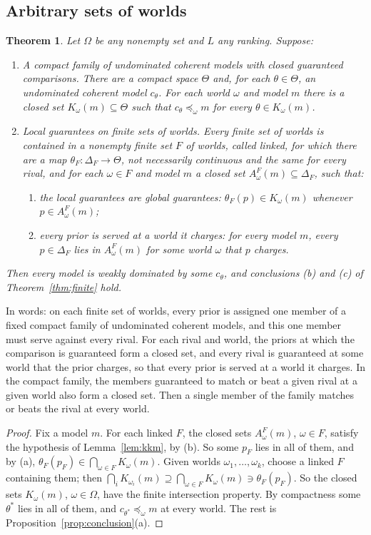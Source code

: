 \documentclass[11pt]{article}
\newtheorem{theorem}{Theorem}[section]
\theoremstyle{definition}
\theoremstyle{remark}
\begin{document}
\subsection{Arbitrary sets of worlds}
\begin{theorem}\label{thm:local}
Let $\Omega$ be any nonempty set and $L$ any ranking. Suppose:
\begin{enumerate}[label=\arabic*.,leftmargin=*]
\item \emph{A compact family of undominated coherent models with closed guaranteed comparisons.} There are a compact space $\Theta$ and, for each $\theta\in\Theta$, an undominated coherent model $c_\theta$. For each world $\omega$ and model $m$ there is a closed set $K_\omega(m)\subseteq\Theta$ such that $c_\theta\preceq_\omega m$ for every $\theta\in K_\omega(m)$.
\item \emph{Local guarantees on finite sets of worlds.} Every finite set of worlds is contained in a nonempty finite set $F$ of worlds, called \emph{linked}, for which there are a map $\theta_F:\Delta_F\to\Theta$, not necessarily continuous and the same for every rival, and for each $\omega\in F$ and model $m$ a closed set $A^F_\omega(m)\subseteq\Delta_F$, such that:
\begin{enumerate}[label=(\alph*)]
\item the local guarantees are global guarantees: $\theta_F(p)\in K_\omega(m)$ whenever $p\in A^F_\omega(m)$;
\item every prior is served at a world it charges: for every model $m$, every $p\in\Delta_F$ lies in $A^F_\omega(m)$ for some world $\omega$ that $p$ charges.
\end{enumerate}
\end{enumerate}
Then every model is weakly dominated by some $c_\theta$, and conclusions (b) and (c) of Theorem~\ref{thm:finite} hold.
\end{theorem}
In words: on each finite set of worlds, every prior is assigned one member of a fixed compact family of undominated coherent models, and this one member must serve against every rival. For each rival and world, the priors at which the comparison is guaranteed form a closed set, and every rival is guaranteed at some world that the prior charges, so that every prior is served at a world it charges. In the compact family, the members guaranteed to match or beat a given rival at a given world also form a closed set. Then a single member of the family matches or beats the rival at every world.
\begin{proof}
Fix a model $m$. For each linked $F$, the closed sets $A^F_\omega(m)$, $\omega\in F$, satisfy the hypothesis of Lemma~\ref{lem:kkm}, by (b). So some $p_F$ lies in all of them, and by (a), $\theta_F(p_F)\in\bigcap_{\omega\in F}K_\omega(m)$. Given worlds $\omega_1,\dots,\omega_k$, choose a linked $F$ containing them; then $\bigcap_iK_{\omega_i}(m)\supseteq\bigcap_{\omega\in F}K_\omega(m)\ni\theta_F(p_F)$. So the closed sets $K_\omega(m)$, $\omega\in\Omega$, have the finite intersection property. By compactness some $\theta^*$ lies in all of them, and $c_{\theta^*}\preceq_\omega m$ at every world. The rest is Proposition~\ref{prop:conclusion}(a).
\end{proof}
\end{document}
